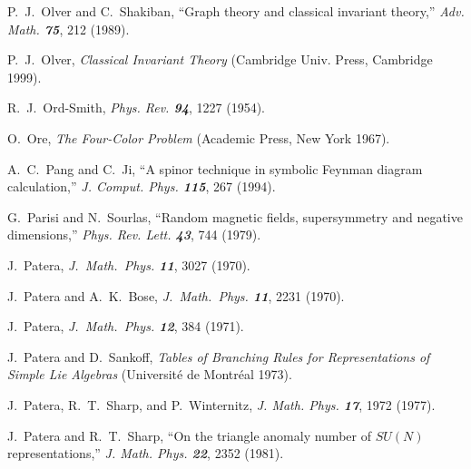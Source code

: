 

 P.~J.~Olver and C.~Shakiban,
``Graph theory and classical invariant theory,''
{\em Adv. Math. \bf 75}, 212 (1989). %

 P.~J.~Olver,
{\em Classical Invariant Theory}
(Cambridge Univ. Press, Cambridge 1999).

R.~J.~Ord-Smith,
{\em Phys.  Rev. \bf 94}, 1227 (1954).

O.~Ore,
{\em The Four-Color Problem}
(Academic Press, New York 1967).


A.~C.~Pang and C.~Ji,
``A spinor technique in symbolic Feynman diagram calculation,''
{\em J.  Comput.  Phys.    \bf 115}, 267 (1994).


G.~Parisi and N.~Sourlas,
``Random magnetic fields, supersymmetry and negative dimensions,''
{\em Phys.  Rev.  Lett.    \bf 43}, 744 (1979).

J.~Patera,
{\em J.~Math.~Phys.  \bf 11}, 3027 (1970).

J.~Patera and A.~K.~Bose,
{\em J.~Math.~Phys.  \bf 11}, 2231 (1970).

 J.~Patera,
{\em J.~Math.~Phys.  \bf 12}, 384 (1971).

 J.~Patera and D.~Sankoff,
{\em Tables of Branching Rules for Representations of Simple Lie Algebras}
(Universit{\'e} de Montr{\'e}al 1973).

J.~Patera, R.~T.~Sharp, and P.~Winternitz,
{\em J. Math. Phys.  \bf 17}, 1972 (1977).

J.~Patera and R.~T.~Sharp,
``On the triangle anomaly number of $SU(N)$ representations,''
{\em J.  Math.  Phys.    \bf 22}, 2352 (1981).

